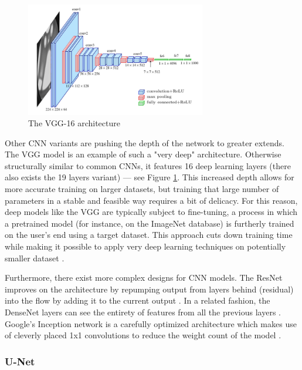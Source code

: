 \begin{figure}[htbp]
    \centering
        \includegraphics[width=0.7\textwidth]{figures/vgg16.PNG}
    \caption{The VGG-16 architecture \cite{vggpic}}
    \label{FigVGG16}
\end{figure}

Other CNN variants are pushing the depth of the network to greater extends. The VGG model is an example of such a "very deep" architecture. Otherwise structurally similar to common CNNs, it features 16 deep learning layers (there also exists the 19 layers variant) --- see Figure \ref{FigVGG16}. This increased depth allows for more accurate training on larger datasets, but training that large number of parameters in a stable and feasible way requires a bit of delicacy. For this reason, deep models like the VGG are typically subject to fine-tuning, a process in which a pretrained model (for instance, on the ImageNet database) is furtherly trained on the user's end using a target dataset. This approach cuts down training time while making it possible to apply very deep learning techniques on potentially smaller dataset \cite{vgg}.

Furthermore, there exist more complex designs for CNN models. The ResNet improves on the architecture by repumping output from layers behind (residual) into the flow by adding it to the current output \cite{resnet}. In a related fashion, the DenseNet layers can see the entirety of features from all the previous layers \cite{densenet}. Google's Inception network is a carefully optimized architecture which makes use of cleverly placed 1x1 convolutions to reduce the weight count of the model \cite{inception}.

\subsubsection{U-Net}
\label{subsubsec:ch3sec3subsec3subsubsec4}

